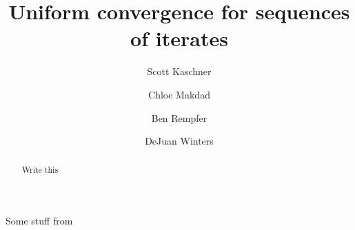 \documentclass[11pt,english]{amsart}
\title{Uniform convergence for sequences of iterates}%
\author{Scott Kaschner}
\author{Chloe Makdad}
\author{Ben Rempfer}
\author{DeJuan Winters}
\theoremstyle{remark}
\begin{document}
\begin{abstract}
Write this
\end{abstract}

\maketitle




Some stuff from \cite{COWEN1}





\end{document}
